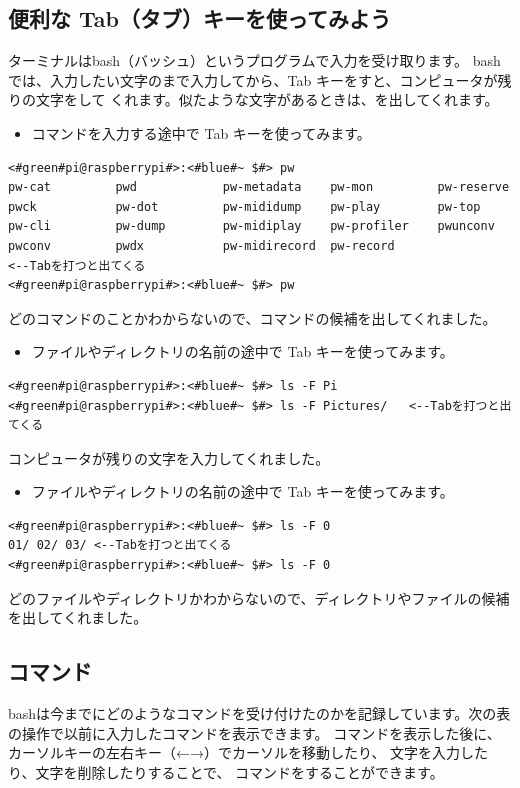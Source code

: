 \documentclass[text03.tex]{subfiles}
\begin{document}
\subsection{便利な Tab（タブ）キーを使ってみよう}
ターミナルはbash（バッシュ）というプログラムで入力を受け取ります。
bashでは、入力したい文字のまで入力してから、Tab キーをすと、コンピュータが残りの文字をして
くれます。似たような文字があるときは、を出してくれます。
\newpage
\begin{itemize}
\item[<例>]コマンドを入力する途中で Tab キーを使ってみます。
\end{itemize}
\begin{lstlisting}[caption=Tabの例1, label=Tab1]
<#green#pi@raspberrypi#>:<#blue#~ $#> pw
pw-cat         pwd            pw-metadata    pw-mon         pw-reserve
pwck           pw-dot         pw-mididump    pw-play        pw-top
pw-cli         pw-dump        pw-midiplay    pw-profiler    pwunconv
pwconv         pwdx           pw-midirecord  pw-record                 <--Tabを打つと出てくる
<#green#pi@raspberrypi#>:<#blue#~ $#> pw
\end{lstlisting}
どのコマンドのことかわからないので、コマンドの候補を出してくれました。
\begin{itemize}
\item[<例>]ファイルやディレクトリの名前の途中で Tab キーを使ってみます。
\end{itemize}
\begin{lstlisting}[caption=Tabの例2, label=Tab2]
<#green#pi@raspberrypi#>:<#blue#~ $#> ls -F Pi
<#green#pi@raspberrypi#>:<#blue#~ $#> ls -F Pictures/	<--Tabを打つと出てくる
\end{lstlisting}
コンピュータが残りの文字を入力してくれました。
\begin{itemize}
\item[<例>]ファイルやディレクトリの名前の途中で Tab キーを使ってみます。
\end{itemize}
\begin{lstlisting}[caption=Tabの例3, label=Tab3]
<#green#pi@raspberrypi#>:<#blue#~ $#> ls -F 0
01/	02/	03/	<--Tabを打つと出てくる
<#green#pi@raspberrypi#>:<#blue#~ $#> ls -F 0
\end{lstlisting}
どのファイルやディレクトリかわからないので、ディレクトリやファイルの候補を出してくれました。

\subsection{コマンド}
bashは今までにどのようなコマンドを受け付けたのかを記録しています。次の表の操作で以前に入力したコマンドを表示できます。
コマンドを表示した後に、カーソルキーの左右キー（←→）でカーソルを移動したり、
文字を入力したり、文字を削除したりすることで、
コマンドをすることができます。
\end{document}
